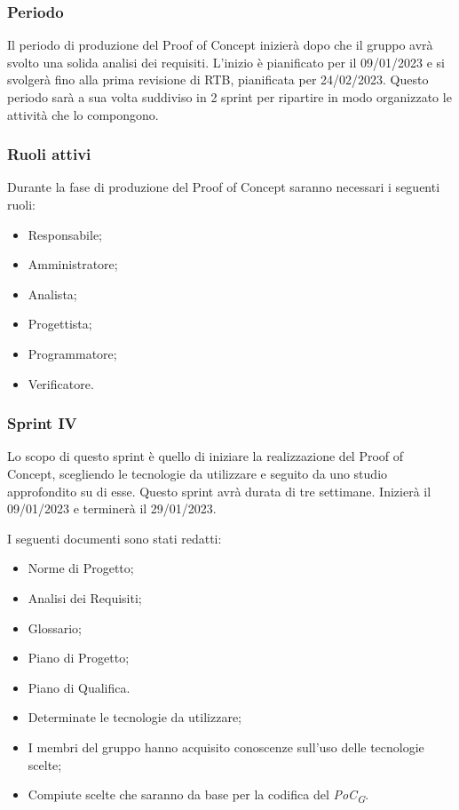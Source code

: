 \subsubsection{Periodo}
Il periodo di produzione del Proof of Concept inizierà dopo che il gruppo avrà svolto una solida analisi dei requisiti. L'inizio è pianificato per il 09/01/2023 e si svolgerà fino alla prima revisione di RTB, pianificata per 24/02/2023. Questo periodo sarà a sua volta suddiviso in 2 sprint per ripartire in modo organizzato le attività che lo compongono.

\subsubsection{Ruoli attivi}
Durante la fase di produzione del Proof of Concept saranno necessari i seguenti ruoli:
\begin{itemize}
	\item Responsabile;
    \item Amministratore;
    \item Analista;
    \item Progettista;
    \item Programmatore;
    \item Verificatore.
\end{itemize}

\subsubsection{Sprint IV}
Lo scopo di questo sprint è quello di iniziare la realizzazione del Proof of Concept, scegliendo le tecnologie da utilizzare e seguito da uno studio approfondito su di esse.
Questo sprint avrà durata di tre settimane. Inizierà il 09/01/2023 e terminerà il 29/01/2023.

I seguenti documenti sono stati redatti:
\begin{itemize}
	\item Norme di Progetto;
	\item Analisi dei Requisiti;
	\item Glossario;
    \item Piano di Progetto;
	\item Piano di Qualifica.
\end{itemize}

\:
\begin{itemize}
	\item Determinate le tecnologie da utilizzare;
	\item I membri del gruppo hanno acquisito conoscenze sull'uso delle tecnologie scelte;
	\item Compiute scelte che saranno da base per la codifica del \textit{PoC\textsubscript{G}}.
\end{itemize}

